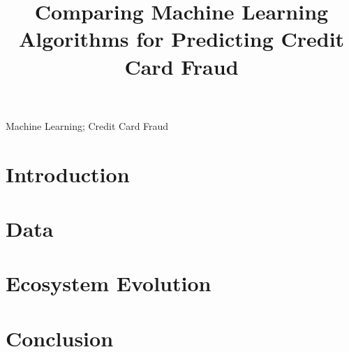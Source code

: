 \documentclass[10pt,conference]{IEEEtran}
\begin{document}
\title{Comparing Machine Learning Algorithms for Predicting Credit Card Fraud\\}

\author{
}

\maketitle

\begin{abstract}
 
\end{abstract}


\begin{IEEEkeywords}
  Machine Learning; Credit Card Fraud
\end{IEEEkeywords}


\section{Introduction}
 


\section{Data}




\section{Ecosystem Evolution}


\section{Conclusion}

\nocite{*}




\vspace{12pt}
\end{document}
